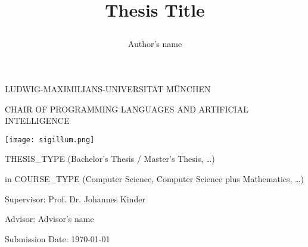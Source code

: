 \documentclass[thesis]{plai}
\title{
    \begin{center}
        \bfseries\LARGE
        Thesis Title
    \end{center}
}
\author{
    \begin{center}
        \large
        Author's name
    \end{center}
}
\date{\relax}
\begin{document}
\begin{center}
    \uppercase{Ludwig-Maximilians-Universität München}
\end{center}

\begin{center}
    \uppercase{Chair of Programming Languages and Artificial Intelligence}
\end{center}

\vspace*{10mm}

\begin{center}
    \texttt{[image: sigillum.png]}
\end{center}

\vspace*{10mm}

{\let\newpage\relax\maketitle}

\thispagestyle{empty}

\begin{center}
    \begin{large}
        \begin{Large}
            THESIS\_TYPE (Bachelor's Thesis / Master's Thesis, \ldots)\\
        \end{Large}
        in COURSE\_TYPE (Computer Science, Computer Science plus Mathematics, \ldots)\\
    \end{large}
\end{center}

\vspace{1cm}

\begin{center}
    \begin{large}
        Supervisor: Prof. Dr. Johannes Kinder\\
    \end{large}
\end{center}

\begin{center}
    \begin{large}
        Advisor: Advisor's name\\
    \end{large}
\end{center}


\begin{center}
    \begin{large}
        Submission Date: \today{}\\
    \end{large}
\end{center}
\end{document}

